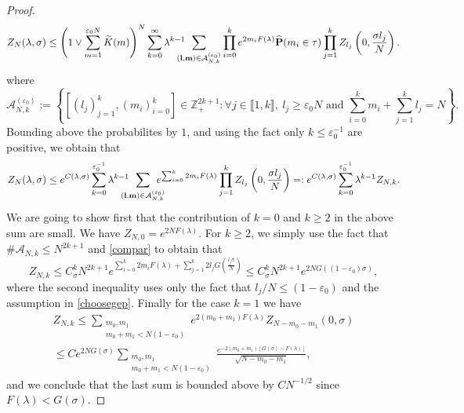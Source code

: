 \documentclass[reqno,11pt]{amsart}
\numberwithin{equation}{section}
\newcommand{\bbZ}{{\ensuremath{\mathbb Z}} }
\newcommand{\gep}{\varepsilon}       %
\newcommand{\gl}{\lambda}
\newcommand{\gs}{\sigma}
\newcommand{\cA}{{\ensuremath{\mathcal A}} }
\newcommand{\bP}{{\ensuremath{\mathbf P}} }
\newcommand{\lint}{\llbracket}
\newcommand{\rint}{\rrbracket}
\renewcommand{\tilde}{\widetilde}
\renewcommand{\hat}{\widehat}
\newcommand{\sumtwo}[2]{\sum_{\substack{#1 \\ #2}}} %
\begin{document}
\begin{proof}
\begin{equation}\label{renewexpress3}
 Z_{N}(\gl,\sigma)\le  \left(1\vee \sum_{m=1}^{\gep_0 N} \tilde K(m)\right)^N  
 \sum_{k=0}^{\infty}  \gl^{k-1} \!\!\!\!\!\!\sum_{ ({\bf l}, {\bf m})\in \cA^{(\gep_0)}_{N,k}} \prod_{i=0}^k e^{2m_i  F(\gl) } \hat \bP( m_i \in \tau)  \prod_{j=1}^k Z_{l_j}\left(0,\frac{\sigma l_j}{N}\right).
\end{equation}
where 
\begin{equation}\label{defank}
  \cA^{(\gep_0)}_{N,k}:= \left\{ [(l_j)_{j=1}^k, (m_i)_{i=0}^k]\in \bbZ^{2k+1}_+  :  \forall j\in \lint 1,k\rint, \ l_j\ge \gep_0 N \text{ and } \sum_{i=0}^k m_i+ \sum_{j=1}^k l_j =N  \right\}.
\end{equation}
Bounding above the probabilites by $1$, and using the fact only  $k\le \gep_0^{-1}$ are positive, we obtain that 
\begin{equation}
  Z_{N}(\gl,\sigma)\le e^{C(\gl,\sigma)}\sum_{k=0}^{\gep_0^{-1}} \gl^{k-1} \!\!\!\!\!\! \sum_{ ({\bf l}, {\bf m})\in \cA^{(\gep_0)}_{N,k}} \!\!\!\!\!\!   e^{\sum_{i=0}^k 2 m_i   F(\gl)}\prod_{j=1}^k Z_{l_j}\left(0,\frac{\sigma l_j}{N}\right)=: e^{C(\gl,\sigma)}
  \sum_{k=0}^{\gep_0^{-1}} \gl^{k-1}Z_{N,k}.
\end{equation}
We are going to show first that the contribution of $k=0$ and $k\ge 2$ in the above sum are small. 
We have $Z_{N,0}=e^{2N  F(\gl)}$.
For $k\ge 2$, we simply use the fact that  $\#\cA_{N,k}\le N^{2k+1}$ and \eqref{compar} to obtain that 
\begin{equation}\label{twoexcurs}
Z_{N,k}\le  C_{\gs}^k N^{2k+1} e^{ \sum_{i=0}^k 2 m_i   F(\gl)  + 
\sum_{j=1}^k 2 l_j  G\left(\frac{l_j \gs}{N}\right)}
\le   C_{\gs}^k N^{2k+1} e^{ 2N   G((1-\gep_0) \sigma)} ,
\end{equation}
where the second inequality uses only the fact that $l_j/N\le (1-\gep_0)$ and the assumption in \eqref{choosegep}.
Finally for the case $k=1$ we have 
\begin{multline}
 Z_{N,k}\le \sumtwo{m_0,m_1}{m_0+m_1< N(1-\gep_0)} e^{2(m_0+m_1)   F(\gl) }
 Z_{N-m_0-m_1}(0,\sigma)
\\ \le C  e^{2N G(\sigma)} \sumtwo{m_0,m_1}{m_0+m_1< N(1-\gep_0)}\frac{e^{-2(m_0+m_1)\left[ G(\sigma)- F(\gl) \right]}}{\sqrt{N-m_0-m_1}},
\end{multline}
and we conclude that the last sum is bounded above by $C N^{-1/2}$ since $F(\gl)<G(\gs)$.


\end{proof}
\end{document}
